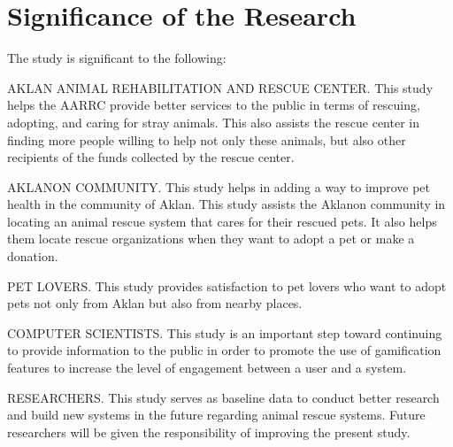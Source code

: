 \section{Significance of the Research}
\label{sec:significance}

The study is significant to the following:

AKLAN ANIMAL REHABILITATION AND RESCUE CENTER. This study helps the AARRC provide better services to the public in terms of rescuing,
adopting, and caring for stray animals. This also assists the rescue center in
finding more people willing to help not only these animals, but also other recipients
of the funds collected by the rescue center.

AKLANON COMMUNITY. This study helps in adding a way to improve
pet health in the community of Aklan. This study  assists the Aklanon community
in locating an animal rescue system that cares for their rescued pets.
It also helps them locate rescue organizations when they want to adopt a pet
or make a donation.

PET LOVERS. This study provides satisfaction to pet lovers who want to
adopt pets not only from Aklan but also from nearby places.

COMPUTER SCIENTISTS. This study is an important step toward continuing
to provide information to the public in order to promote the use of gamification
features to increase the level of engagement between a user and a system.

RESEARCHERS. This study serves as baseline data to conduct better research
and build new systems in the future regarding animal rescue systems. Future
researchers will be given the responsibility of improving the present study.
%
%



